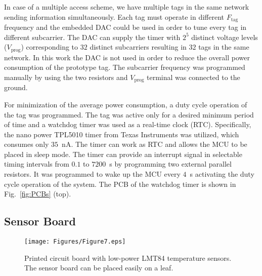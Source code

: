 \documentclass[journal]{IEEEtran}
\begin{document}
In case of a multiple access scheme, we have multiple tags in the same network sending information simultaneously. 
%
Each tag must operate in  different $F_{\text{tag}}$  frequency  and the embedded  DAC could be used in order to tune every tag in different subcarrier. 
%
The DAC can supply the timer with $2^5$ distinct voltage levels ($V_\text{prog}$) corresponding to $32$ distinct subcarriers resulting in $32$ tags in the same network.
%
In this work the DAC is not used in order to reduce the overall power consumption of the prototype tag. 
%
The  subcarrier frequency was programmed manually by using the two resistors and $V_\text{prog}$ terminal was connected to the ground.


For minimization of the average power consumption, a duty cycle operation of the tag was programmed.
%
The tag was active only for a desired minimum period of time and a watchdog timer was  used  as a real-time clock (RTC). 
%
Specifically, the nano power TPL5010 timer from Texas Instruments \cite{instrumentsTPL5010} 
 was utilized, which consumes  only $35$~nA.
%
The timer can work as RTC and allows the MCU to be placed in  sleep mode.  
%
The timer can provide an interrupt signal in selectable timing intervals from $0.1$ to $7200$~s by programming  two external parallel resistors.
%
It was programmed to wake up the MCU every $4$~s 
activating the duty cycle operation of the system.
%
The PCB of the watchdog timer is shown in Fig.~\ref{fig:PCBs} (top).

\subsection{Sensor Board}
\label{subsec:sensorboard}

\begin{figure}[t]
\centering
\texttt{[image: Figures/Figure7.eps]}
\caption{Printed circuit board with  low-power LMT84 temperature sensors. The  sensor board can be placed easily on a leaf.}
\label{fig:sensboard}
\end{figure}
\end{document}
